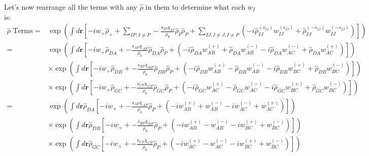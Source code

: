 \documentclass{article}
\begin{document}
Let's now rearrange all the terms with any $\hat{\rho}$ in them to determine
  what each $w_I$ is:
\begin{align*}
  \hat{\rho}\textrm{ Terms} =
    &\exp \left(
      \int d \mathbf{r} \left[
        - i w_+ \hat{\rho}_+
        +
        \sum_{IP,I \ne P}
        - \frac{s_{IP}\chi_{IJ}}{\rho_0}
        \hat{\rho}_I \hat{\rho}_P
        +
        \sum_{IJ, I \ne J, I \ne P}
        \left(
          -i \hat{\rho}_{IJ}^{(s_{IJ})} w_{IJ}^{(s_{IJ})}
          + \hat{\rho}_{IJ}^{(-s_{IJ})} w_{IJ}^{(-s_{IJ})}
        \right)
      \right]
    \right) \\
  =
    &\exp \left(
      \int d \mathbf{r} \left[
        - i w_+ \hat{\rho}_{DA}
        +
        - \frac{s_{AP}\chi_{AP}}{\rho_0}
        \hat{\rho}_{DA} \hat{\rho}_P
        +
        \left(
          -i \hat{\rho}_{DA} w_{AB}^{(+)} + \hat{\rho}_{DA} w_{AB}^{(-)}
          -i \hat{\rho}_{DA} w_{AC}^{(-)} + \hat{\rho}_{DA} w_{AC}^{(+)}
        \right)
      \right]
    \right) \\
    &\times
    \exp \left(
      \int d \mathbf{r} \left[
        - i w_+ \hat{\rho}_{DB}
        +
        - \frac{s_{BP}\chi_{BP}}{\rho_0}
        \hat{\rho}_{DB} \hat{\rho}_P
        +
        \left(
          -i \hat{\rho}_{DB} w_{AB}^{(+)} - \hat{\rho}_{DB} w_{AB}^{(-)}
          -i \hat{\rho}_{DB} w_{BC}^{(+)} + \hat{\rho}_{DB} w_{BC}^{(-)}
        \right)
      \right]
    \right) \\
    &\times
    \exp \left(
      \int d \mathbf{r} \left[
        - i w_+ \hat{\rho}_{GC}
        +
        - \frac{s_{CP}\chi_{CP}}{\rho_0}
        \hat{\rho}_{GC} \hat{\rho}_P
        +
        \left(
          -i \hat{\rho}_{GC} w_{AC}^{(+)} - \hat{\rho}_{GC} w_{AC}^{(-)}
          -i \hat{\rho}_{GC} w_{BC}^{(+)} + \hat{\rho}_{GC} w_{BC}^{(-)}
        \right)
      \right]
    \right) \\
  =
    &\exp \left(
      \int d \mathbf{r} \hat{\rho}_{DA} \left[
        - i w_+ 
        +
        - \frac{s_{AP}\chi_{AP}}{\rho_0}
        \hat{\rho}_P
        +
        \left(
          -i w_{AB}^{(+)} + w_{AB}^{(-)}
          -i w_{AC}^{(-)} + w_{AC}^{(+)}
        \right)
      \right]
    \right) \\
    &\times
    \exp \left(
      \int d \mathbf{r} \hat{\rho}_{DB} \left[
        - i w_+
        +
        - \frac{s_{BP}\chi_{BP}}{\rho_0}
        \hat{\rho}_P
        +
        \left(
          -i w_{AB}^{(+)} - w_{AB}^{(-)}
          -i w_{BC}^{(+)} + w_{BC}^{(-)}
        \right)
      \right]
    \right) \\
    &\times
    \exp \left(
      \int d \mathbf{r} \hat{\rho}_{GC} \left[
        - i w_+
        +
        - \frac{s_{CP}\chi_{CP}}{\rho_0}
        \hat{\rho}_P
        +
        \left(
          -i w_{AC}^{(+)} - w_{AC}^{(-)}
          -i w_{BC}^{(+)} + w_{BC}^{(-)}
        \right)
      \right]
    \right) \\
\end{align*}
\end{document}
